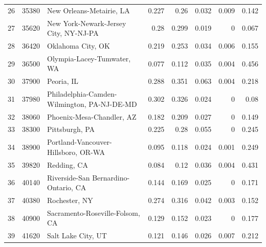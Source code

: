 \documentclass[
  10pt,
]{article}
\begin{document}
\begin{table}[h]
\begin{center}
{\begin{tabular}{rrlrrrrr}
 26 &  35380 & New Orleans-Metairie, LA                     &            0.227 &             0.26  &            0.032 &     0.009 &      0.142 \\
 27 &  35620 & New York-Newark-Jersey City, NY-NJ-PA        &            0.28  &             0.299 &            0.019 &     0     &      0.067 \\
 28 &  36420 & Oklahoma City, OK                            &            0.219 &             0.253 &            0.034 &     0.006 &      0.155 \\
 29 &  36500 & Olympia-Lacey-Tumwater, WA                   &            0.077 &             0.112 &            0.035 &     0.004 &      0.456 \\
 30 &  37900 & Peoria, IL                                   &            0.288 &             0.351 &            0.063 &     0.004 &      0.218 \\
 31 &  37980 & Philadelphia-Camden-Wilmington, PA-NJ-DE-MD  &            0.302 &             0.326 &            0.024 &     0     &      0.08  \\
 32 &  38060 & Phoenix-Mesa-Chandler, AZ                    &            0.182 &             0.209 &            0.027 &     0     &      0.149 \\
 33 &  38300 & Pittsburgh, PA                               &            0.225 &             0.28  &            0.055 &     0     &      0.245 \\
 34 &  38900 & Portland-Vancouver-Hillsboro, OR-WA          &            0.095 &             0.118 &            0.024 &     0.001 &      0.249 \\
 35 &  39820 & Redding, CA                                  &            0.084 &             0.12  &            0.036 &     0.004 &      0.431 \\
 36 &  40140 & Riverside-San Bernardino-Ontario, CA         &            0.144 &             0.169 &            0.025 &     0     &      0.171 \\
 37 &  40380 & Rochester, NY                                &            0.274 &             0.316 &            0.042 &     0.003 &      0.152 \\
 38 &  40900 & Sacramento-Roseville-Folsom, CA              &            0.129 &             0.152 &            0.023 &     0     &      0.177 \\
 39 &  41620 & Salt Lake City, UT                           &            0.121 &             0.146 &            0.026 &     0.007 &      0.212 \\

\end{tabular}}
\end{center}
\end{table}
\end{document}
